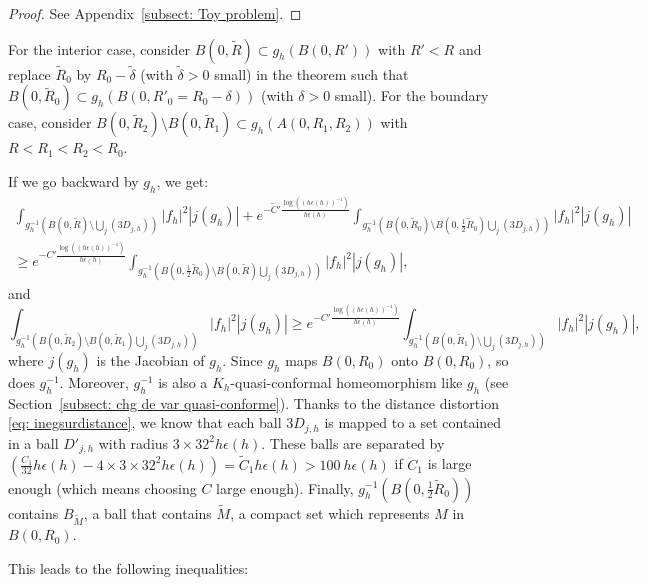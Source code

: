 \documentclass[leqno,11pt,letterpaper, english]{amsart}
\theoremstyle{plain}
\theoremstyle{definition}
\numberwithin{equation}{section}
\begin{document}
\begin{proof}
See Appendix~\ref{subsect: Toy problem}.
\end{proof}

For the interior case, consider $B(0, \tilde{R}) \subset g_h(B(0, R'))$ with $R'<R$ and replace $\tilde{R}_0$ by $R_0 - \tilde{\delta}$ (with $\tilde{\delta} > 0$ small) in the theorem such that $B(0, \tilde{R}_0) \subset g_h(B(0, R'_0 = R_0 - \delta))$ (with $\delta > 0$ small). For the boundary case, consider $B(0, \tilde{R}_2) \setminus B(0, \tilde{R}_1) \subset g_h(A(0, R_1, R_2))$ with $R<R_1 < R_2 < R_0$.

If we go backward by $g_h$, we get:
\begin{multline}
\int_{g_h^{-1}(B(0, \tilde{R}) \setminus \bigcup_j (3D_{j,h}))} |f_h|^2 |j(g_h)| + e^{-\tilde{C}' \frac{\log((h\epsilon(h))^{-1})}{h\epsilon(h)}} \int_{g_h^{-1}(B(0, \tilde{R}_0) \setminus B(0, \frac{1}{2}\tilde{R}_0) \bigcup_j (3D_{j,h}))} |f_h|^2 |j(g_h)|\\ \geq e^{-C' \frac{\log((h\epsilon(h))^{-1})}{h\epsilon(h)}} \int_{g_h^{-1}(B(0, \frac{1}{2}\tilde{R}_0) \setminus B(0, \tilde{R}) \bigcup_j (3D_{j,h}))} |f_h|^2 |j(g_h)|,
\end{multline}
and
\begin{equation}
\int_{g_h^{-1}(B(0, \tilde{R}_2) \setminus B(0, \tilde{R}_1) \bigcup_j (3D_{j,h}))} |f_h|^2 |j(g_h)| \geq e^{-C' \frac{\log((h\epsilon(h))^{-1})}{h\epsilon(h)}} \int_{g_h^{-1}(B(0, \tilde{R}_1) \setminus \bigcup_j (3D_{j,h}))} |f_h|^2 |j(g_h)|,
\end{equation}
where $j(g_h)$ is the Jacobian of $g_h$. Since $g_h$ maps $B(0, R_0)$ onto $B(0, R_0)$, so does $g_h^{-1}$. Moreover, $g_h^{-1}$ is also a $K_h$-quasi-conformal homeomorphism like $g_h$ (see Section~\ref{subsect: chg de var quasi-conforme}). Thanks to the distance distortion \eqref{eq: inegsurdistance}, we know that each ball $3D_{j,h}$ is mapped to a set contained in a ball $D'_{j,h}$ with radius $3 \times 32^2 h\epsilon(h)$. These balls are separated by $(\frac{C_1}{32} h\epsilon(h) - 4 \times 3 \times 32^2 h\epsilon(h)) = \tilde{C}_1 h\epsilon(h) > 100\ h\epsilon(h)$ if $C_1$ is large enough (which means choosing $C$ large enough). Finally, $g_h^{-1}(B(0, \frac{1}{2}\tilde{R}_0))$ contains $B_{\tilde{M}}$, a ball that contains $\tilde{M}$, a compact set which represents $M$ in $B(0, R_0)$.

This leads to the following inequalities:
\end{document}
